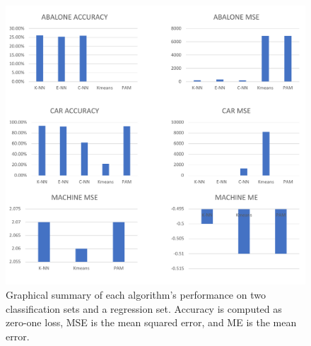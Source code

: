 \documentclass[twoside,11pt]{article}
\begin{document}
\begin{figure}[h]
	\includegraphics[width=\linewidth]{comparisongraphs.pdf}
	\caption{Graphical summary of each algorithm's performance on two classification sets and a regression set. Accuracy is computed as zero-one loss, MSE is the mean squared error, and ME is the mean error.}
	\label{fig:comparealgs}
\end{figure}


\end{document}
